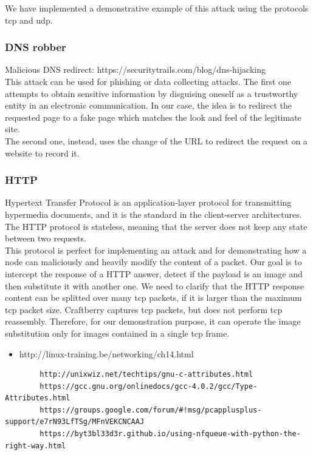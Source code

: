 \documentclass[12pt]{article}
\begin{document}
	We have implemented a demonstrative example of this attack using the protocols tcp and udp.\\

	\subsubsection{DNS robber}

	Malicious DNS redirect: https://securitytrails.com/blog/dns-hijacking\\

	This attack can be used for phishing or data collecting attacks. The first one attempts to obtain sensitive information by disguising oneself as a trustworthy entity in an electronic communication. In our case, the idea is to redirect the requested page to a fake page which matches the look and feel of the legitimate site.\\
	The second one, instead, uses the change of the URL to redirect the request on a website to record it.

	\subsubsection{HTTP}

	Hypertext Transfer Protocol is an application-layer protocol for transmitting hypermedia documents, and it is the standard in the client-server architectures. The HTTP protocol is stateless, meaning that the server does not keep any state between two requests.\\
	This protocol is perfect for implementing an attack and for demonstrating how a node can maliciously and heavily modify the content of a packet. Our goal is to intercept the response of a HTTP answer, detect if the payload is an image and then substitute it with another one. We need to clarify that the HTTP response content can be splitted over many tcp packets, if it is larger than the maximum tcp packet size. Craftberry captures tcp packets, but does not perform tcp reassembly. Therefore, for our demonstration purpose, it can operate the image substitution only for images contained in a single tcp frame.

	
	\begin{itemize}
		\item http://linux-training.be/networking/ch14.html
	\end{itemize}

	\begin{verbatim}
		http://unixwiz.net/techtips/gnu-c-attributes.html
		https://gcc.gnu.org/onlinedocs/gcc-4.0.2/gcc/Type-Attributes.html
		https://groups.google.com/forum/#!msg/pcapplusplus-support/e7rN93LfTSg/MFnVEKCNCAAJ
		https://byt3bl33d3r.github.io/using-nfqueue-with-python-the-right-way.html
		
	\end{verbatim}
			
\end{document}
